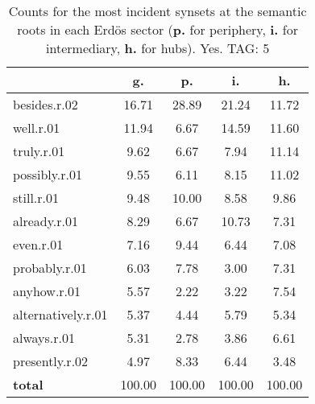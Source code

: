 \begin{table}[h!]
\begin{center}
\begin{tabular}{| l || c | c | c | c |}\hline
 & {\bf g.} & {\bf p.} & {\bf i.} & {\bf h.} \\\hline\hline
besides.r.02 & 16.71  & 28.89  & 21.24  & 11.72 \\\hline
well.r.01 & 11.94  & 6.67  & 14.59  & 11.60 \\\hline
truly.r.01 & 9.62  & 6.67  & 7.94  & 11.14 \\\hline
possibly.r.01 & 9.55  & 6.11  & 8.15  & 11.02 \\\hline
still.r.01 & 9.48  & 10.00  & 8.58  & 9.86 \\\hline
already.r.01 & 8.29  & 6.67  & 10.73  & 7.31 \\\hline
even.r.01 & 7.16  & 9.44  & 6.44  & 7.08 \\\hline
probably.r.01 & 6.03  & 7.78  & 3.00  & 7.31 \\\hline
anyhow.r.01 & 5.57  & 2.22  & 3.22  & 7.54 \\\hline
alternatively.r.01 & 5.37  & 4.44  & 5.79  & 5.34 \\\hline
always.r.01 & 5.31  & 2.78  & 3.86  & 6.61 \\\hline
presently.r.02 & 4.97  & 8.33  & 6.44  & 3.48 \\\hline\hline
{{\bf total}} & 100.00  & 100.00  & 100.00  & 100.00 \\\hline
\end{tabular}
\caption{Counts for the most incident synsets at the semantic roots in each Erd\"os sector ({\bf p.} for periphery, {\bf i.} for intermediary, {\bf h.} for hubs). Yes. TAG: 5}
\end{center}
\end{table}